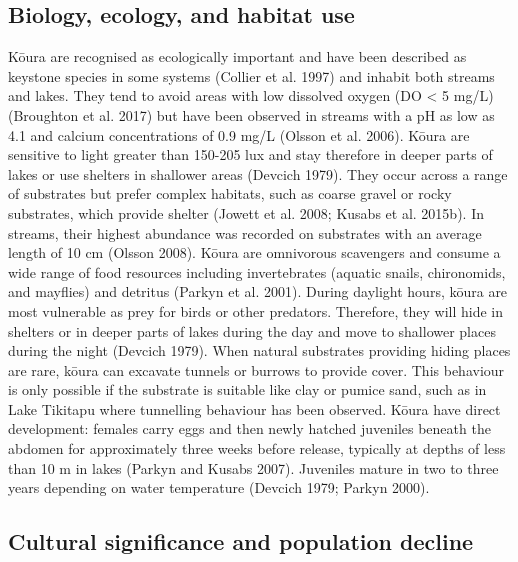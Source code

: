\documentclass[
  12pt,
  a4paper,
]{scrbook}
\begin{document}
\subsection{Biology, ecology, and habitat
use}\label{biology-ecology-and-habitat-use}

Kōura are recognised as ecologically important and have been described
as keystone species in some systems (Collier et al. 1997) and inhabit
both streams and lakes. They tend to avoid areas with low dissolved
oxygen (DO \textless{} 5 mg/L) (Broughton et al. 2017) but have been
observed in streams with a pH as low as 4.1 and calcium concentrations
of 0.9 mg/L (Olsson et al. 2006). Kōura are sensitive to light greater
than 150-205 lux and stay therefore in deeper parts of lakes or use
shelters in shallower areas (Devcich 1979). They occur across a range of
substrates but prefer complex habitats, such as coarse gravel or rocky
substrates, which provide shelter (Jowett et al. 2008; Kusabs et al.
2015b). In streams, their highest abundance was recorded on substrates
with an average length of 10 cm (Olsson 2008). Kōura are omnivorous
scavengers and consume a wide range of food resources including
invertebrates (aquatic snails, chironomids, and mayflies) and detritus
(Parkyn et al. 2001). During daylight hours, kōura are most vulnerable
as prey for birds or other predators. Therefore, they will hide in
shelters or in deeper parts of lakes during the day and move to
shallower places during the night (Devcich 1979). When natural
substrates providing hiding places are rare, kōura can excavate tunnels
or burrows to provide cover. This behaviour is only possible if the
substrate is suitable like clay or pumice sand, such as in Lake Tikitapu
where tunnelling behaviour has been observed. Kōura have direct
development: females carry eggs and then newly hatched juveniles beneath
the abdomen for approximately three weeks before release, typically at
depths of less than 10 m in lakes (Parkyn and Kusabs 2007). Juveniles
mature in two to three years depending on water temperature (Devcich
1979; Parkyn 2000).

\subsection{Cultural significance and population
decline}\label{cultural-significance-and-population-decline}
\end{document}
